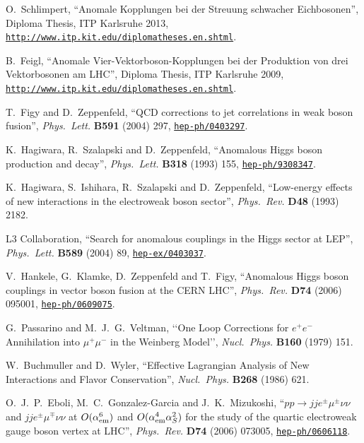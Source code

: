 \documentclass[english,12pt]{article}
\begin{document}
\begin{thebibliography}{10}
O.~Schlimpert, ``Anomale Kopplungen bei der Streuung schwacher
Eichbosonen'', {Diploma Thesis, ITP Karlsruhe 2013}, 
\href{http://www.itp.kit.edu/diplomatheses.en.shtml}{{\tt http://www.itp.kit.edu/diplomatheses.en.shtml}}.

B.~Feigl, ``Anomale Vier-Vektorboson-Kopplungen bei der Produktion von drei 
    Vektorbosonen am LHC'', {Diploma Thesis, ITP Karlsruhe 2009}, 
\href{http://www.itp.kit.edu/diplomatheses.en.shtml}{{\tt http://www.itp.kit.edu/diplomatheses.en.shtml}}.

T.~Figy and D.~Zeppenfeld, ``{QCD corrections to jet correlations in weak boson
  fusion}'', {\em Phys.\ Lett.} {\bf B591} (2004) 297,
\href{http://www.arXiv.org/abs/hep-ph/0403297}{{\tt hep-ph/0403297}}.

K.~Hagiwara, R.~Szalapski and D.~Zeppenfeld, ``{Anomalous Higgs boson
  production and decay}'', {\em Phys.\ Lett.} {\bf B318} (1993) 155,
\href{http://www.arXiv.org/abs/hep-ph/9308347}{{\tt hep-ph/9308347}}.

K.~Hagiwara, S.~Ishihara, R.~Szalapski and D.~Zeppenfeld, ``{Low-energy effects
  of new interactions in the electroweak boson sector}'', {\em Phys.\ Rev.} {\bf
  D48} (1993) 2182.

{L3} Collaboration, ``{Search for anomalous couplings in
  the Higgs sector at LEP}'', {\em Phys.\ Lett.} {\bf B589} (2004) 89,
\href{http://www.arXiv.org/abs/hep-ex/0403037}{{\tt hep-ex/0403037}}.

V.~Hankele, G.~Klamke, D.~Zeppenfeld and T.~Figy, ``{Anomalous Higgs boson
  couplings in vector boson fusion at the CERN LHC}'', {\em Phys.\ Rev.} {\bf
  D74} (2006) 095001,
\href{http://www.arXiv.org/abs/hep-ph/0609075}{{\tt hep-ph/0609075}}.

  G.~Passarino and M.~J.~G.~Veltman,
  `{`One Loop Corrections for $e^+e^-$ Annihilation into $\mu^+\mu^-$ in the Weinberg
  Model}'',
  {\em Nucl.\ Phys.}  {\bf B160} (1979) 151.

W.~Buchmuller and D.~Wyler, ``{Effective Lagrangian Analysis of New Interactions
  and Flavor Conservation}'', {\em Nucl.\ Phys.} {\bf B268} (1986)
621.

O.~J.~P.~Eboli, M.~C.~Gonzalez-Garcia and J.~K.~Mizukoshi, 
                  ``{$p p \to j j e^\pm \mu^\pm \nu \nu$ and $j j e^\pm \mu^\mp \nu \nu$ at
                  $O(\alpha_{\rm em}^6)$ and $O(\alpha_{\rm em}^4 \alpha_S^2)$ for the
                  study of the quartic electroweak gauge boson vertex at
                  LHC}'', {\em Phys.\ Rev.} {\bf D74} (2006) 073005,
\href{http://www.arXiv.org/abs/hep-ph/0606118}{{\tt hep-ph/0606118}}.


\end{thebibliography}
\end{document}
